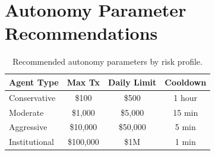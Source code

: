 \section{Autonomy Parameter Recommendations}


\begin{table}[t]
\centering
\begin{tabular}{lccc}
\toprule
\textbf{Agent Type} & \textbf{Max Tx} & \textbf{Daily Limit} & \textbf{Cooldown} \\
\midrule
Conservative & \$100 & \$500 & 1 hour \\
Moderate & \$1,000 & \$5,000 & 15 min \\
Aggressive & \$10,000 & \$50,000 & 5 min \\
Institutional & \$100,000 & \$1M & 1 min \\
\bottomrule
\end{tabular}
\caption{Recommended autonomy parameters by risk profile.}
\label{tab:params}
\end{table}


